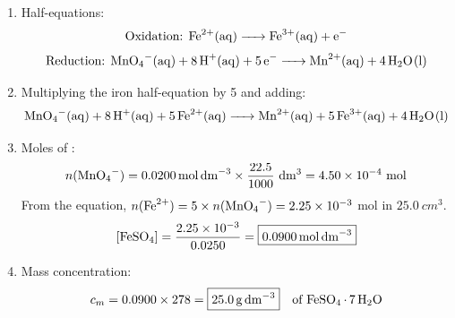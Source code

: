 \documentclass[11pt]{article}
\begin{document}
\begin{corrige}
\begin{enumerate}
\item Half-equations:
\[
\text{Oxidation: } \ce{Fe^{2+}(aq) -> Fe^{3+}(aq) + e-}
\]
\[
\text{Reduction: } \ce{MnO4^{-}(aq) + 8H^{+}(aq) + 5e- -> Mn^{2+}(aq) + 4H2O(l)}
\]

\item Multiplying the iron half-equation by 5 and adding:
\[
\ce{MnO4^{-}(aq) + 8H^{+}(aq) + 5Fe^{2+}(aq) -> Mn^{2+}(aq) + 5Fe^{3+}(aq) + 4H2O(l)}
\]

\item Moles of :
\[
n(\ce{MnO4^-}) = \SI{0.0200}{mol\,dm^{-3}} \times \frac{22.5}{1000}\ \mathrm{dm^3} = 4.50\times 10^{-4}\ \mathrm{mol}
\]
From the equation, $n(\ce{Fe^{2+}}) = 5 \times n(\ce{MnO4^-}) = 2.25\times 10^{-3}$ mol in $\SI{25.0}{cm^3}$.
\[
[\ce{FeSO4}] = \frac{2.25\times 10^{-3}}{0.0250} = \boxed{\SI{0.0900}{mol\,dm^{-3}}}
\]

\item Mass concentration:
\[
c_m = 0.0900 \times 278 = \boxed{\SI{25.0}{g\,dm^{-3}}} \quad \text{of } \ce{FeSO4.7H2O}
\]
\end{enumerate}
\end{corrige}
\end{document}
